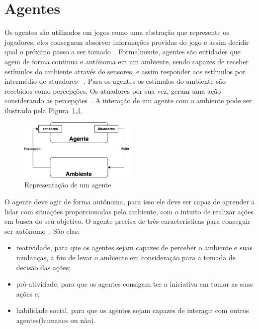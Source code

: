 \chapter{\label{chap:agentes}Agentes} 

Os agentes são utilizados em jogos como uma abstração que represente os jogadores, eles conseguem absorver informações providas do jogo e assim decidir qual o próximo passo a ser tomado~\cite{millington2009artificial}. 
Formalmente, agentes são entidades que agem de forma continua e autônoma em um ambiente, sendo capazes de receber estímulos do ambiente através de sensores, e assim responder aos estímulos por intermédio de atuadores ~\cite{agent1993oriented}. 
Para os agentes os estímulos do ambiente são recebidos como percepções. 
Os atuadores por sua vez, geram uma ação considerando as percepções~\cite[Capítulo 7]{intelligence2003modern}. 
A interação de um agente com o ambiente pode ser ilustrado pela Figura~\ref{fig:agente}.

\begin{figure}[ht]
	\centering
	\includegraphics[width=0.5\textwidth]{fig/agente.pdf}
	\caption{Representação de um agente}
	\label{fig:agente}
\end{figure} 

O agente deve agir de forma autônoma, para isso ele deve ser capaz de aprender a lidar com situações proporcionadas pelo ambiente, com o intuito de realizar ações em busca do seu objetivo. O agente precisa de três características para conseguir ser autônomo~\cite{agent1999}. São elas:
 
\begin{itemize}
	\item reatividade, para que os agentes sejam capazes de perceber o ambiente e suas mudanças, a fim de levar o ambiente em consideração para a tomada de decisão das ações;
	\item pró-atividade, para que os agentes consigam ter a iniciativa em tomar as suas ações e;
	\item habilidade social, para que os agentes sejam capazes de interagir com outros agentes(humanos ou não).
\end{itemize}

